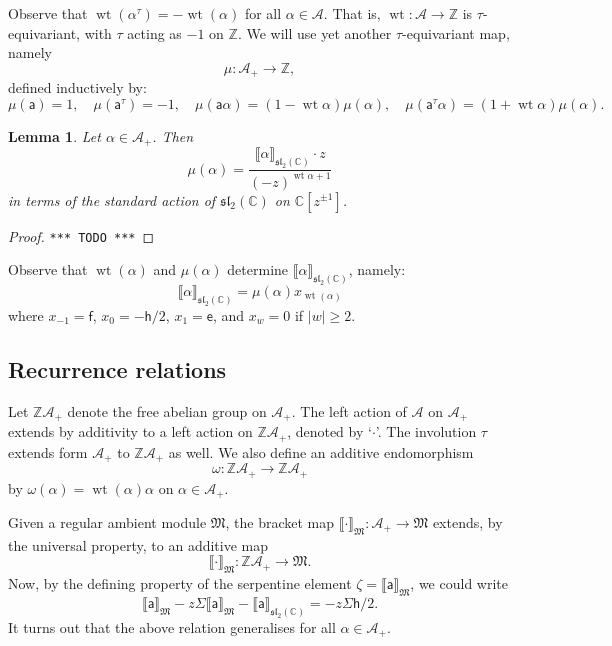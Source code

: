 \documentclass{article}
\def\MISS{\texttt{*** TODO ***}}
\def\llb{\llbracket}
\def\rrb{\rrbracket}
\def\fsl{\mathfrak{sl}}
\def\fM{\mathfrak{M}}
\def\sA{\mathscr{A}}
\def\ZZ{\mathbb{Z}}
\def\CC{\mathbb{C}}
\def\inv{\tau} %
\DeclareMathOperator{\wt}{\mathrm{wt}}
\def\a{\mathsf{a}}
\def\e{\mathsf{e}}
\def\h{\mathsf{h}}
\def\f{\mathsf{f}}
\newtheorem{lem}{Lemma}
\theoremstyle{definition}
\begin{document}
Observe that $\wt(\alpha^\inv) = -\wt(\alpha)$ for
all $\alpha\in\sA$. That is, $\wt:\sA\to\ZZ$ is $\inv$-equivariant,
with $\inv$ acting as $-1$ on $\ZZ$.
We will use yet another $\inv$-equivariant map, namely
$$ \mu : \sA_+ \to \ZZ,$$
defined inductively by:
$$
\mu(\a)=1,\quad\mu(\a^\inv)=-1,\quad \mu(\a\alpha) = (1-\wt\alpha)\mu(\alpha),\quad
\mu(\a^\inv\alpha) = (1 + \wt\alpha)\mu(\alpha).
$$
\begin{lem}
        Let $\alpha \in \sA_+$. Then
        $$
         \mu(\alpha) = \frac{\llb\alpha\rrb_{\fsl_2(\CC)} \cdot z}{(-z)^{\wt\alpha + 1}}
        $$
        in terms of the standard action of $\fsl_2(\CC)$ on $\CC[z^{\pm1}]$.
\end{lem}

\begin{proof}\MISS\end{proof}

Observe that $\wt(\alpha)$ and $\mu(\alpha)$ determine $\llb\alpha\rrb_{\fsl_2(\CC)}$, namely:
$$
\llb\alpha\rrb_{\fsl_2(\CC)} = \mu(\alpha) x_{\wt(\alpha)}
$$
where
$x_{-1}=\f$, $x_0 = -\h/2$, $x_1 = \e$,
and $x_w=0$ if $|w|\ge2$.

\subsection{Recurrence relations}

Let $\ZZ\sA_+$ denote the free abelian group on $\sA_+$.
The left action of $\sA$ on $\sA_+$ extends by additivity 
to a left action on $\ZZ\sA_+$, denoted by `$\cdot$'. The
involution $\inv$ extends form $\sA_+$ to $\ZZ\sA_+$ as well.
We also define an additive endomorphism
$$ \omega : \ZZ\sA_+ \to \ZZ\sA_+ $$
by $\omega(\alpha)=\wt(\alpha)\alpha$ on $\alpha\in\sA_+$.

Given a regular ambient module $\fM$,
the bracket map $\llb\cdot\rrb_\fM : \sA_+ \to \fM$
extends, by the universal property, to an additive map
$$ \llb \cdot \rrb_\fM : \ZZ\sA_+ \to \fM. $$
Now, by the defining property of the serpentine element $\zeta = \llb \a\rrb_\fM$, we could write
$$
\llb \a \rrb_\fM - z\Sigma\llb \a\rrb_\fM - \llb \a\rrb_{\fsl_2(\CC)} = - z\Sigma \h/2.
$$
It turns out that the above relation generalises
for all $\alpha \in \sA_+$.
\end{document}
